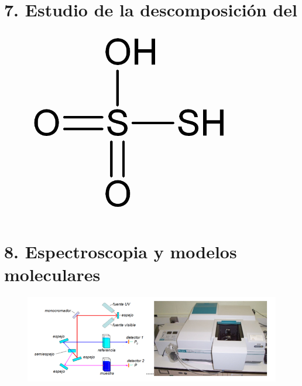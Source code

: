 \documentclass[12pt,letterpaper,oneside,openany,spanish]{book}
\begin{document}
\chapter[Práctica 7]{7. Estudio de la descomposición del }
\thispagestyle{empty}
\vspace{1cm}
\begin{figure}[h]
    \centering
    \hspace*{-0.2cm}
    \includegraphics[width=0.8\textwidth]{prac7/Portada.png}
    \hspace*{-0.4cm}
\end{figure}


\chapter[Práctica 8]{8. Espectroscopia y modelos moleculares}
\thispagestyle{empty}
\vspace{1.5cm}
\begin{figure}[h]
    \centering
    \hspace*{-0.2cm}
    \includegraphics[width=1.1\textwidth]{fotos/espectrofotometro_uv_vis.png}
    \hspace*{-0.4cm}
\end{figure}

\end{document}
